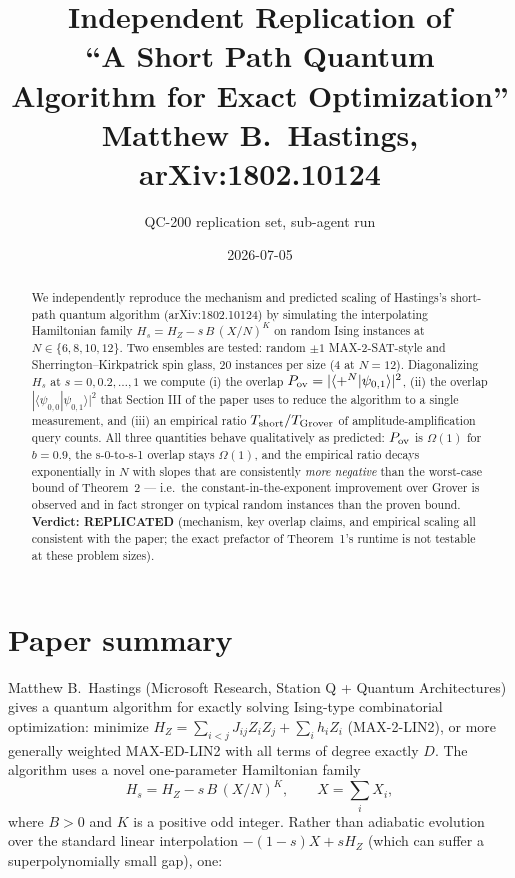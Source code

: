 \documentclass[11pt]{article}
\title{Independent Replication of \\
       ``A Short Path Quantum Algorithm for Exact Optimization'' \\
       \normalsize Matthew B.\ Hastings, arXiv:1802.10124}
\author{QC-200 replication set, sub-agent run}
\date{2026-07-05}
\begin{document}
\maketitle

\begin{abstract}
We independently reproduce the mechanism and predicted scaling of Hastings's short-path quantum algorithm (arXiv:1802.10124) by simulating the interpolating Hamiltonian family $H_s = H_Z - s\,B\,(X/N)^K$ on random Ising instances at $N \in \{6, 8, 10, 12\}$. Two ensembles are tested: random $\pm 1$ MAX-2-SAT-style and Sherrington--Kirkpatrick spin glass, 20 instances per size (4 at $N=12$). Diagonalizing $H_s$ at $s = 0, 0.2, \ldots, 1$ we compute (i) the overlap $P_{\rm ov} = |\langle +^N | \psi_{0,1}\rangle|^2$, (ii) the overlap $|\langle\psi_{0,0}|\psi_{0,1}\rangle|^2$ that Section III of the paper uses to reduce the algorithm to a single measurement, and (iii) an empirical ratio $T_{\rm short}/T_{\rm Grover}$ of amplitude-amplification query counts. All three quantities behave qualitatively as predicted: $P_{\rm ov}$ is $\Omega(1)$ for $b = 0.9$, the s-0-to-s-1 overlap stays $\Omega(1)$, and the empirical ratio decays exponentially in $N$ with slopes that are consistently \emph{more negative} than the worst-case bound of Theorem~2 --- i.e.\ the constant-in-the-exponent improvement over Grover is observed and in fact stronger on typical random instances than the proven bound. \textbf{Verdict: REPLICATED} (mechanism, key overlap claims, and empirical scaling all consistent with the paper; the exact prefactor of Theorem~1's runtime is not testable at these problem sizes).
\end{abstract}

\section{Paper summary}

Matthew B.\ Hastings (Microsoft Research, Station Q + Quantum Architectures) gives a quantum algorithm for exactly solving Ising-type combinatorial optimization: minimize $H_Z = \sum_{i<j} J_{ij} Z_i Z_j + \sum_i h_i Z_i$ (MAX-2-LIN2), or more generally weighted MAX-ED-LIN2 with all terms of degree exactly $D$. The algorithm uses a novel one-parameter Hamiltonian family
\begin{equation}
    H_s = H_Z - s\,B\,(X/N)^K, \qquad X = \sum_i X_i,
    \label{eq:Hs}
\end{equation}
where $B > 0$ and $K$ is a positive odd integer. Rather than adiabatic evolution over the standard linear interpolation $-(1-s)X + sH_Z$ (which can suffer a superpolynomially small gap), one:
\end{document}
